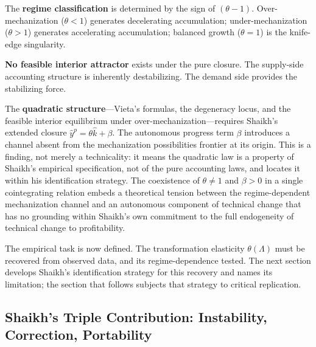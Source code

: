 \documentclass[11pt,a4paper]{article}
\begin{document}
The \textbf{regime classification} is determined by the sign of $(\theta - 1)$. Over-mechanization ($\theta < 1$) generates decelerating accumulation; under-mechanization ($\theta > 1$) generates accelerating accumulation; balanced growth ($\theta = 1$) is the knife-edge singularity.

\textbf{No feasible interior attractor} exists under the pure closure. The supply-side accounting structure is inherently destabilizing. The demand side provides the stabilizing force.

The \textbf{quadratic structure}---Vieta's formulas, the degeneracy locus, and the feasible interior equilibrium under over-mechanization---requires Shaikh's extended closure $\hat{y}^p = \theta\hat{k} + \beta$. The autonomous progress term $\beta$ introduces a channel absent from the mechanization possibilities frontier at its origin. This is a finding, not merely a technicality: it means the quadratic law is a property of Shaikh's empirical specification, not of the pure accounting laws, and locates it within his identification strategy. The coexistence of $\theta \neq 1$ and $\beta > 0$ in a single cointegrating relation embeds a theoretical tension between the regime-dependent mechanization channel and an autonomous component of technical change that has no grounding within Shaikh's own commitment to the full endogeneity of technical change to profitability.

The empirical task is now defined. The transformation elasticity $\theta(\Lambda)$ must be recovered from observed data, and its regime-dependence tested. The next section develops Shaikh's identification strategy for this recovery and names its limitation; the section that follows subjects that strategy to critical replication.



\subsection{Shaikh's Triple Contribution: Instability, Correction, Portability}
\label{sec:shaikh_triple}
\end{document}
